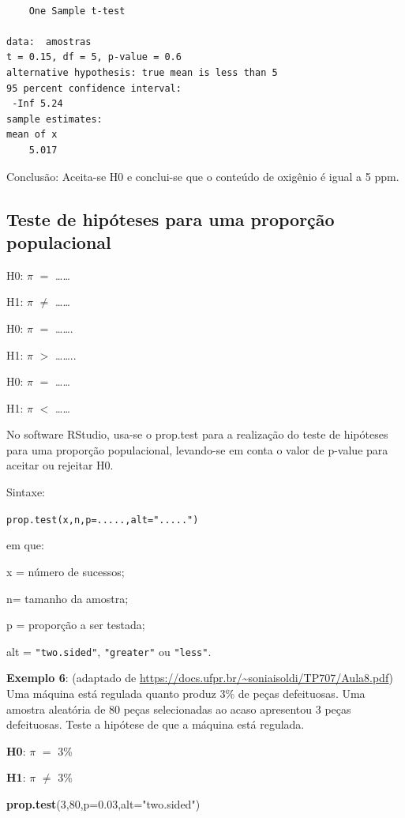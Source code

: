 \documentclass[12pt,portuguese,oneside]{book}
\newenvironment{Shaded}{\begin{snugshade}}{\end{snugshade}}
\newcommand{\KeywordTok}[1]{\textcolor[rgb]{0.13,0.29,0.53}{\textbf{#1}}}
\newcommand{\DataTypeTok}[1]{\textcolor[rgb]{0.13,0.29,0.53}{#1}}
\newcommand{\DecValTok}[1]{\textcolor[rgb]{0.00,0.00,0.81}{#1}}
\newcommand{\FloatTok}[1]{\textcolor[rgb]{0.00,0.00,0.81}{#1}}
\newcommand{\StringTok}[1]{\textcolor[rgb]{0.31,0.60,0.02}{#1}}
\newcommand{\NormalTok}[1]{#1}
\begin{document}
\begin{verbatim}

    One Sample t-test

data:  amostras
t = 0.15, df = 5, p-value = 0.6
alternative hypothesis: true mean is less than 5
95 percent confidence interval:
 -Inf 5.24
sample estimates:
mean of x 
    5.017 
\end{verbatim}

Conclusão: Aceita-se H0 e conclui-se que o conteúdo de oxigênio é igual
a 5 ppm.

\subsection{Teste de hipóteses para uma proporção
populacional}\label{teste-de-hipoteses-para-uma-proporcao-populacional}

H0: \(\pi\) \(=\) \ldots{}\ldots{}

H1: \(\pi\) \(\neq\) \ldots{}\ldots{}

H0: \(\pi\) \(=\) \ldots{}\ldots{}.

H1: \(\pi\) \(>\) \ldots{}\ldots{}..

H0: \(\pi\) \(=\) \ldots{}\ldots{}

H1: \(\pi\) \(<\) \ldots{}\ldots{}

No software RStudio, usa-se o prop.test para a realização do teste de
hipóteses para uma proporção populacional, levando-se em conta o valor
de p-value para aceitar ou rejeitar H0.

Sintaxe:

\texttt{prop.test(x,n,p=.....,alt=".....")}

em que:

x = número de sucessos;

n= tamanho da amostra;

p = proporção a ser testada;

alt = \texttt{"two.sided"}, \texttt{"greater"} ou \texttt{"less"}.

\textbf{Exemplo 6}: (adaptado de
\url{https://docs.ufpr.br/~soniaisoldi/TP707/Aula8.pdf}) Uma máquina
está regulada quanto produz 3\% de peças defeituosas. Uma amostra
aleatória de 80 peças selecionadas ao acaso apresentou 3 peças
defeituosas. Teste a hipótese de que a máquina está regulada.

\textbf{H0}: \(\pi\) \(=\) 3\%

\textbf{H1}: \(\pi\) \(\neq\) 3\%

\begin{Shaded}
\begin{Highlighting}[]
\KeywordTok{prop.test}\NormalTok{(}\DecValTok{3}\NormalTok{,}\DecValTok{80}\NormalTok{,}\DataTypeTok{p=}\FloatTok{0.03}\NormalTok{,}\DataTypeTok{alt=}\StringTok{"two.sided"}\NormalTok{)}
\end{Highlighting}
\end{Shaded}
\end{document}
